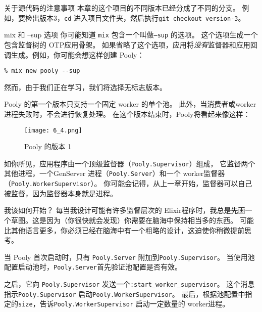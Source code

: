 \begin{note}{关于源代码的注意事项}
本章的这个项目的不同版本已经分成了不同的分支。
例如，要检出版本3，\texttt{cd} 进入项目文件夹，然后执行\texttt{git checkout version-3}。
\end{note}

\begin{note}{mix 和 --sup 选项}
你可能知道 \texttt{mix} 包含一个叫做\texttt{--sup} 的选项。
这个选项生成一个包含监督树的 OTP应用骨架。
如果省略了这个选项，应用将\emph{没有}监督器和应用回调生成。例如，你可能会想这样创建
Pooly：

\begin{code}{}
\begin{verbatim}
% mix new pooly --sup
\end{verbatim}
\end{code}

然而，由于我们正在学习，我们将选择无标志版本。
\end{note}

Pooly 的第一个版本只支持一个固定 worker 的单个池。
此外，当消费者或worker 进程失败时，不会进行恢复处理。
在这个版本结束时，Pooly将看起来像这样：

\begin{figure}[!ht]
    \centering
    \texttt{[image: 6\_4.png]}
    \caption{Pooly 的版本 1}
    \label{fig:6_4}
\end{figure}


如你所见，应用程序由一个顶级监督器（\texttt{Pooly.Supervisor}）组成，
它监督两个其他进程，一个GenServer 进程（\texttt{Pooly.Server}）和一个 worker监督器（\texttt{Pooly.WorkerSupervisor}）。
你可能会记得，从上一章开始，监督器可以自己被监督，因为监督器本身就是进程。

\begin{note}{我该如何开始？}
每当我设计可能有许多监督层次的 Elixir程序时，我总是先画一个草图。这是因为（你很快就会发现）你需要在脑海中保持相当多的东西。
可能比其他语言更多，你必须已经在脑海中有一个粗略的设计，这迫使你稍微提前思考。
\end{note}

当 Pooly 首次启动时，只有 \texttt{Pooly.Server} 附加到\texttt{Pooly.Supervisor}。
当使用池配置启动池时，\texttt{Pooly.Server}首先验证池配置是否有效。

之后，它向 \texttt{Pooly.Supervisor} 发送一个\texttt{:start\_worker\_supervisor}。
这个消息指示\texttt{Pooly.Supervisor} 启动\texttt{Pooly.WorkerSupervisor}。
最后，根据池配置中指定的\texttt{size}，告诉\texttt{Pooly.WorkerSupervisor} 启动一定数量的 worker进程。

